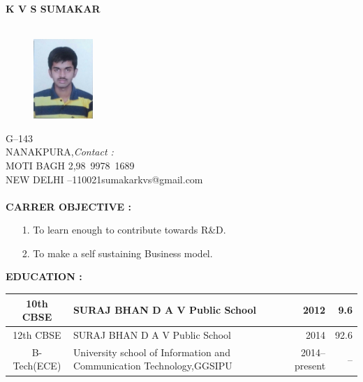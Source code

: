 \documentclass{article}
\begin{document}
	\begin{center}
		\textbf{K V S SUMAKAR}\\
		\hrulefill\\
		
	\end{center}
	\begin{figure}[h]
		\centering
	\includegraphics[width=0.2\textwidth]{IMG-20160524-WA0002}
	
	\end{figure}
	G--143\\ 
	NANAKPURA,\hfill \textsl{Contact :}\\
	MOTI BAGH 2,\hfill \mbox{98 9978 1689}\\
	NEW DELHI --\mbox{110021}\hfill \mbox{sumakarkvs@gmail.com}\\
	\\
	
	\textbf{CARRER OBJECTIVE :}
	\begin{itemize}
\item[1.] 	To learn enough to contribute towards R\&D.
\item[2.]	To make a self sustaining Business model.\\
	\end{itemize}
	

	\textbf{EDUCATION :\\}

	\begin{tabular}{|c|p{60 mm}|r|r|}
 \hline
		 10th CBSE  &                    SURAJ BHAN D A V Public School                    &            2012 &             9.6 \\ \hline
		 12th CBSE  &                    SURAJ BHAN D A V Public School                    &            2014 &            92.6 \\ \hline
		B-Tech(ECE) & University school of Information and Communication Technology,GGSIPU &   2014--present &              -- \\ \hline
	\end{tabular}
	
	
\end{document}
